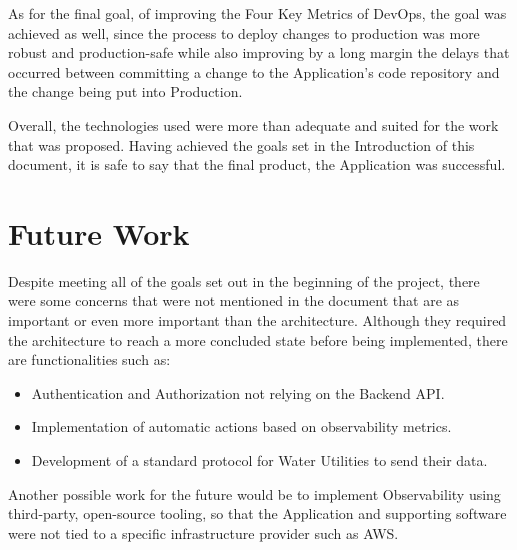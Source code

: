As for the final goal, of improving the Four Key Metrics of DevOps, the goal was achieved as well, since the process to deploy changes to production was more robust and production-safe while also improving by a long margin the delays that occurred between committing a change to the Application's code repository and the change being put into Production. 

Overall, the technologies used were more than adequate and suited for the work that was proposed. Having achieved the goals set in the Introduction of this document, it is safe to say that the final product, the Application was successful.

\section{Future Work}\label{conclusion:s:future-work}

Despite meeting all of the goals set out in the beginning of the project, there were some concerns that were not mentioned in the document that are as important or even more important than the architecture. 
Although they required the architecture to reach a more concluded state before being implemented, there are functionalities such as:

\begin{itemize}
    \item Authentication and Authorization not relying on the Backend API.
    \item Implementation of automatic actions based on observability metrics.
    \item Development of a standard protocol for Water Utilities to send their data.
\end{itemize}

Another possible work for the future would be to implement Observability using third-party, open-source tooling, so that the Application and supporting software were not tied to a specific infrastructure provider such as AWS. 